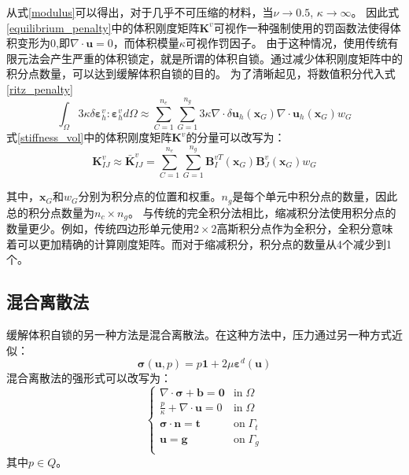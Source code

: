 从式\eqref{modulus}可以得出，对于几乎不可压缩的材料，当$\nu \rightarrow 0.5$, $\kappa \rightarrow \infty$。
因此式\eqref{equilibrium_penalty}中的体积刚度矩阵$\boldsymbol K^v$可视作一种强制使用的罚函数法使得体积变形为$0$,即$\nabla \cdot \boldsymbol u = 0$，而体积模量$\kappa$可视作罚因子。
由于这种情况，使用传统有限元法会产生严重的体积锁定，就是所谓的体积自锁。通过减少体积刚度矩阵中的积分点数量，可以达到缓解体积自锁的目的。
为了清晰起见，将数值积分代入式\eqref{ritz_penalty}
\begin{equation}
    \int_\Omega 3\kappa \delta \boldsymbol \varepsilon^v_h : \boldsymbol \varepsilon^v_h d\Omega \approx
    \sum_{C=1}^{n_e}\sum_{G=1}^{n_g} 3\kappa \nabla \cdot \delta \boldsymbol u_h(\boldsymbol x_G) \nabla \cdot \boldsymbol u_h(\boldsymbol x_G) w_G
\end{equation}
式\eqref{stiffness_vol}中的体积刚度矩阵$\boldsymbol K^v$的分量可以改写为：
\begin{equation}
    \boldsymbol K^v_{IJ} \approx \bar{\boldsymbol K}^v_{IJ} = \sum_{C=1}^{n_e}\sum_{G=1}^{n_g} \boldsymbol B^{vT}_I(\boldsymbol x_G) \boldsymbol B_J^v(\boldsymbol x_G) w_G
\end{equation}

其中，$\boldsymbol x_G$和$w_G$分别为积分点的位置和权重。$n_g$是每个单元中积分点的数量，因此总的积分点数量为$n_c \times n_g$。
与传统的完全积分法相比，缩减积分法使用积分点的数量更少。例如，传统四边形单元使用$2\times2$高斯积分点作为全积分，全积分意味着可以更加精确的计算刚度矩阵。而对于缩减积分，积分点的数量从4个减少到1个。

\subsection{混合离散法}
缓解体积自锁的另一种方法是混合离散法。在这种方法中，压力通过另一种方式近似：
\begin{equation}\label{stress_mix}
    \boldsymbol \sigma(\boldsymbol u, p) = p \boldsymbol 1 + 2\mu \boldsymbol \varepsilon^d(\boldsymbol u)
\end{equation}
混合离散法的强形式可以改写为：
\begin{equation}\label{strong_mix}
    \begin{cases}
        \nabla \cdot \boldsymbol \sigma + \boldsymbol b = \boldsymbol 0 & \mathrm{in} \; \Omega \\
        \frac{p}{\kappa} + \nabla \cdot \boldsymbol u = 0 & \mathrm{in} \; \Omega \\
        \boldsymbol \sigma \cdot \boldsymbol n = \boldsymbol t & \mathrm{on} \; \Gamma_t \\
        \boldsymbol u = \boldsymbol g & \mathrm{on} \; \Gamma_g \\
    \end{cases}
\end{equation}
其中$p\in Q$。

